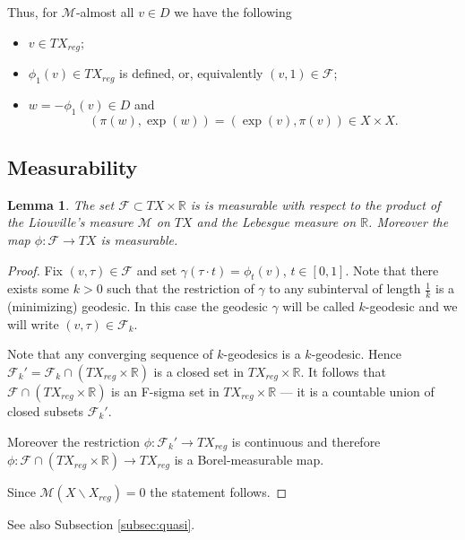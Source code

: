 \documentclass[12pt,leqno,intlimits]{amsart}
\numberwithin{equation}{section}
\newtheorem{lem}[thm]{Lemma}
\theoremstyle{definition}
\theoremstyle{remark}
\newcommand{\R}{\mathbb{R}}
\def\:{\colon}
\begin{document}
Thus, for $\mathcal M$-almost all $v\in D$ we have the following
\begin{itemize}
\item $v\in TX_{reg}$;
\item $\phi _1(v) \in TX_{reg}$ is defined, or, equivalently $(v,1)\in \mathcal F$;
\item $w=-\phi_1 (v)\in D$ and
\begin{equation} \label{eq:symm}
(\pi (w), \exp (w))=(\exp (v), \pi (v)) \in X\times X.
\end{equation}
\end{itemize}

{\color{red}

\subsection{Measurability} \label{subsec:measur}

\begin{lem}\label{lem:measurability}
The set $\mathcal F\subset TX\times \R$ is
is measurable with respect to the product of the Liouville's measure $\mathcal M$ on $TX$ and the Lebesgue measure on $\R$.
Moreover the map $\phi \:\mathcal F \to TX$ is measurable.
\end{lem}

\begin{proof}
Fix $(v,\tau)\in \mathcal F$ and set $\gamma(\tau\cdot t)=\phi_t(v)$, $t\in[0,1]$.
Note that there exists some $k>0$ such that the restriction of $\gamma$ to any subinterval of length $\frac 1 k$ is a (minimizing) geodesic.
In this case the geodesic $\gamma$ will be called $k$-geodesic and
we will write $(v,\tau)\in \mathcal F_k$.

Note that any converging sequence of $k$-geodesics is a $k$-geodesic.
Hence $\mathcal F_k'=\mathcal F_k\cap (TX_{reg} \times \R)$ is a closed set in $TX_{reg} \times \R$.
It follows that $\mathcal F\cap (TX_{reg} \times \R)$ is an F-sigma set in $TX_{reg} \times \R$ --- it is a countable union of closed subsets $\mathcal F_k'$.

Moreover the restriction $\phi\: \mathcal F_k' \to TX_{reg}$ is continuous and therefore
$\phi \:\mathcal F\cap (TX_{reg} \times \R) \to TX_{reg}$ is a Borel-measurable map.

Since $\mathcal M(X\backslash X_{reg})=0$ the statement follows.
\end{proof}

See also Subsection \ref{subsec:quasi}.
}
\end{document}
